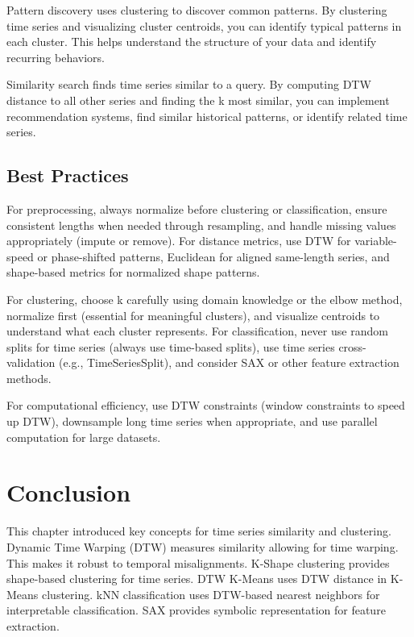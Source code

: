 Pattern discovery uses clustering to discover common patterns. By clustering time series and visualizing cluster centroids, you can identify typical patterns in each cluster. This helps understand the structure of your data and identify recurring behaviors.

Similarity search finds time series similar to a query. By computing DTW distance to all other series and finding the k most similar, you can implement recommendation systems, find similar historical patterns, or identify related time series.

\subsection{Best Practices}

For preprocessing, always normalize before clustering or classification, ensure consistent lengths when needed through resampling, and handle missing values appropriately (impute or remove). For distance metrics, use DTW for variable-speed or phase-shifted patterns, Euclidean for aligned same-length series, and shape-based metrics for normalized shape patterns.

For clustering, choose k carefully using domain knowledge or the elbow method, normalize first (essential for meaningful clusters), and visualize centroids to understand what each cluster represents. For classification, never use random splits for time series (always use time-based splits), use time series cross-validation (e.g., TimeSeriesSplit), and consider SAX or other feature extraction methods.

For computational efficiency, use DTW constraints (window constraints to speed up DTW), downsample long time series when appropriate, and use parallel computation for large datasets.



\section{Conclusion}

This chapter introduced key concepts for time series similarity and clustering. Dynamic Time Warping (DTW) measures similarity allowing for time warping. This makes it robust to temporal misalignments. K-Shape clustering provides shape-based clustering for time series. DTW K-Means uses DTW distance in K-Means clustering. kNN classification uses DTW-based nearest neighbors for interpretable classification. SAX provides symbolic representation for feature extraction.

